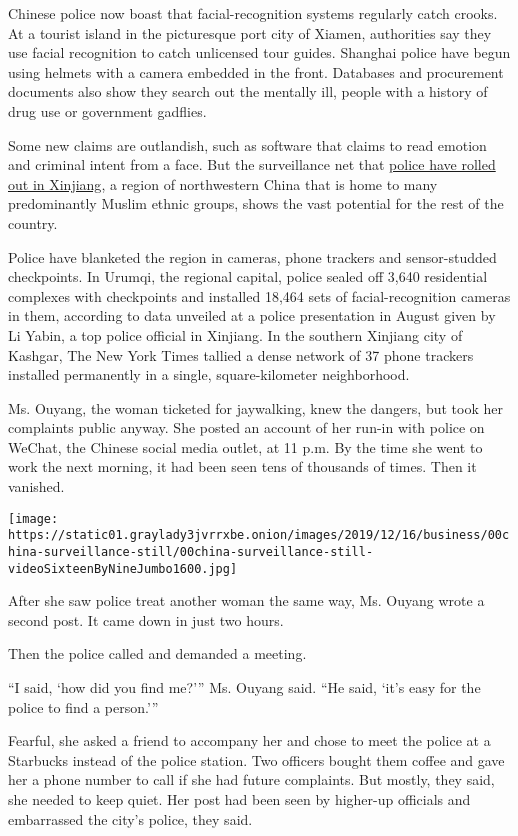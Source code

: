 Chinese police now boast that facial-recognition systems regularly catch
crooks. At a tourist island in the picturesque port city of Xiamen,
authorities say they use facial recognition to catch unlicensed tour
guides. Shanghai police have begun using helmets with a camera embedded
in the front. Databases and procurement documents also show they search
out the mentally ill, people with a history of drug use or government
gadflies.

Some new claims are outlandish, such as software that claims to read
emotion and criminal intent from a face. But the surveillance net that
\href{https://www.nytimes3xbfgragh.onion/interactive/2019/04/04/world/asia/xinjiang-china-surveillance-prison.html}{police
have rolled out in Xinjiang}, a region of northwestern China that is
home to many predominantly Muslim ethnic groups, shows the vast
potential for the rest of the country.

Police have blanketed the region in cameras, phone trackers and
sensor-studded checkpoints. In Urumqi, the regional capital, police
sealed off 3,640 residential complexes with checkpoints and installed
18,464 sets of facial-recognition cameras in them, according to data
unveiled at a police presentation in August given by Li Yabin, a top
police official in Xinjiang. In the southern Xinjiang city of Kashgar,
The New York Times tallied a dense network of 37 phone trackers
installed permanently in a single, square-kilometer neighborhood.

Ms. Ouyang, the woman ticketed for jaywalking, knew the dangers, but
took her complaints public anyway. She posted an account of her run-in
with police on WeChat, the Chinese social media outlet, at 11 p.m. By
the time she went to work the next morning, it had been seen tens of
thousands of times. Then it vanished.

\texttt{[image: https://static01.graylady3jvrrxbe.onion/images/2019/12/16/business/00china-surveillance-still/00china-surveillance-still-videoSixteenByNineJumbo1600.jpg]}

After she saw police treat another woman the same way, Ms. Ouyang wrote
a second post. It came down in just two hours.

Then the police called and demanded a meeting.

``I said, `how did you find me?''' Ms. Ouyang said. ``He said, `it's
easy for the police to find a person.'''

Fearful, she asked a friend to accompany her and chose to meet the
police at a Starbucks instead of the police station. Two officers bought
them coffee and gave her a phone number to call if she had future
complaints. But mostly, they said, she needed to keep quiet. Her post
had been seen by higher-up officials and embarrassed the city's police,
they said.

